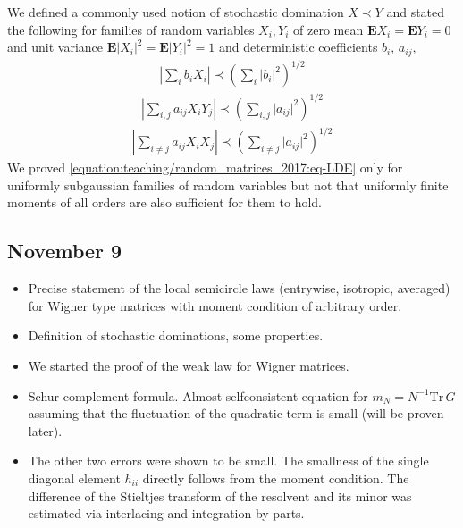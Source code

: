 \documentclass[letterpaper,10pt,english]{sphinxhowto}
\begin{document}
\sphinxAtStartPar
We defined a commonly used notion of stochastic domination \(X\prec Y\) and stated the following  for families of random variables \(X_i,Y_i\) of zero mean \(\mathbf E X_i=\mathbf E Y_i=0\) and unit variance \(\mathbf E \lvert X_i\rvert^2=\mathbf E \lvert Y_i\rvert^2=1\) and deterministic coefficients \(b_i\), \(a_{ij}\),
\begin{equation*}
\begin{split}
\left\lvert\sum_{i} b_i X_i\right\rvert\prec \left(\sum_i\lvert b_i\rvert^2\right)^{1/2}
\end{split}
\end{equation*}\begin{equation}\label{equation:teaching/random_matrices_2017:eq-LDE}
\begin{split}
\left\lvert\sum_{i,j} a_{ij} X_i Y_j\right\rvert\prec \left(\sum_{i,j}\lvert a_{ij}\rvert^2\right)^{1/2}
\end{split}
\end{equation}\begin{equation*}
\begin{split}
\left\lvert\sum_{i\not=j} a_{ij} X_i X_j\right\rvert\prec \left(\sum_{i\not=j}\lvert a_{ij}\rvert^2\right)^{1/2}
\end{split}
\end{equation*}
\sphinxAtStartPar
We proved \eqref{equation:teaching/random_matrices_2017:eq-LDE} only for uniformly subgaussian families of random variables but not that uniformly finite moments of all orders are also sufficient for them to hold.


\subsection{November 9}
\label{\detokenize{teaching/random_matrices_2017:november-9}}\begin{itemize}
\item {} 
\sphinxAtStartPar
Precise statement of the local semicircle laws (entrywise, isotropic, averaged) for Wigner type matrices with moment condition of arbitrary order.

\item {} 
\sphinxAtStartPar
Definition of stochastic dominations, some properties.

\item {} 
\sphinxAtStartPar
We started the proof of the weak law for Wigner matrices.

\item {} 
\sphinxAtStartPar
Schur complement formula. Almost selfconsistent equation for \(m_N = N^{-1} \text{Tr}\, G\) assuming that the fluctuation of the quadratic term is small (will be proven later).

\item {} 
\sphinxAtStartPar
The other two errors were shown to be small. The smallness of the single diagonal element \(h_{ii}\) directly follows from the moment condition. The difference of the Stieltjes transform of the resolvent and its minor was estimated via interlacing and integration by parts.

\end{itemize}
\end{document}
